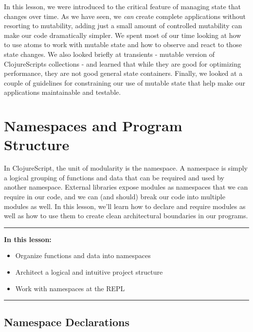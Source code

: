 \documentclass[10pt,twoside,openright]{memoir}
\begin{document}
In this lesson, we were introduced to the critical feature of managing
state that changes over time. As we have seen, we \emph{can} create
complete applications without resorting to mutability, adding just a
small amount of controlled mutability can make our code dramatically
simpler. We spent most of our time looking at how to use atoms to work
with mutable state and how to observe and react to those state changes.
We also looked briefly at transients - mutable version of ClojureScripts
collections - and learned that while they are good for optimizing
performance, they are not good general state containers. Finally, we
looked at a couple of guidelines for constraining our use of mutable
state that help make our applications maintainable and testable.

\chapter{Namespaces and Program Structure}

In ClojureScript, the unit of modularity is the namespace. A namespace
is simply a logical grouping of functions and data that can be required
and used by another namespace. External libraries expose modules as
namespaces that we can require in our code, and we can (and should)
break our code into multiple modules as well. In this lesson, we'll
learn how to declare and require modules as well as how to use them to
create clean architectural boundaries in our programs.

\begin{center}\rule{0.5\linewidth}{0.5pt}\end{center}

\textbf{In this lesson:}

\begin{itemize}
\tightlist
\item
  Organize functions and data into namespaces
\item
  Architect a logical and intuitive project structure
\item
  Work with namespaces at the REPL
\end{itemize}

\begin{center}\rule{0.5\linewidth}{0.5pt}\end{center}

\section{Namespace Declarations}
\end{document}
